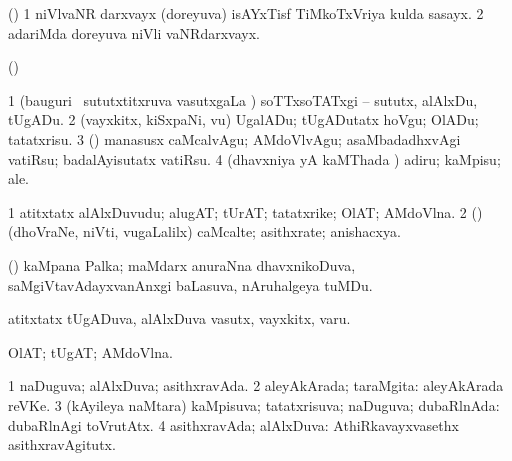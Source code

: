 {{{{{{\bentry
{} 
\gl{\BAavayx}
\expl{}
\bmng
{} 
\emng
\eentry

\bentry
{} 
\gl{\saMkiSx}
\expl{}
\bmng
{} 
\emng
\eentry

\bentry
{} 
\gl{\nA}
\expl{}
\bmng
(\ca) 
\bnum
\num{1} niVlvaNR darxvayx (doreyuva) isAYxTisf TiMkoTxVriya kulda sasayx. 
\num{2} adariMda doreyuva niVli vaNRdarxvayx. 
\enum
\emng
\eentry

\bentry
{} 
\gl{\nA}
\expl{}
\bmng
(\AseTxrXV)  
\emng
\eentry

\bentry
{} 
\gl{\akirx}
\expl{}
\bmng
\bnum
\num{1} (bauguri \mo\ sututxtitxruva vasutxgaLa \vi) soTTxsoTATxgi -- sututx, alAlxDu, tUgADu. 
\num{2} (vayxkitx, kiSxpaNi, \mo vu) UgalADu; tUgADutatx hoVgu; OlADu; tatatxrisu. 
\num{3} (\rUpa) manasusx caMcalvAgu; AMdoVlvAgu; asaMbadadhxvAgi vatiRsu; badalAyisutatx vatiRsu. 
\num{4} (dhavxniya yA kaMThada \vi) adiru; kaMpisu; ale. 
\enum
\emng
\eentry

\bentry
{} 
\gl{\nA}
\expl{}
\bmng
\bnum
\num{1} atitxtatx alAlxDuvudu; alugAT; tUrAT; tatatxrike; OlAT; AMdoVlna. 
\num{2} (\rUpa) (dhoVraNe, niVti, \mo vugaLalilx) caMcalte; asithxrate; anishacxya. 
\enum
\emng
\eentry

\bentry
{} 
\gl{\nA}
\expl{}
\bmng
(\AseTxrXV) kaMpana Palka; maMdarx anuraNna dhavxnikoDuva, saMgiVtavAdayxvanAnxgi baLasuva, nAruhalgeya tuMDu. 
\emng
\eentry

\bentry
{} 
\gl{\nA}
\expl{}
\bmng
atitxtatx tUgADuva, alAlxDuva vasutx, vayxkitx, \mo varu. 
\emng
\eentry

\bentry
{} 
\gl{\nA}
\expl{}
\bmng
OlAT; tUgAT; AMdoVlna. 
\emng
\eentry

\bentry
{} 
\gl{\gu}
\bmng
\bnum
\num{1} naDuguva; alAlxDuva; asithxravAda. 
\num{2} aleyAkArada; taraMgita:  aleyAkArada reVKe. 
\num{3} (kAyileya naMtara) kaMpisuva; tatatxrisuva; naDuguva; dubaRlnAda:  dubaRlnAgi toVrutAtx. 
\num{4} asithxravAda; alAlxDuva:  AthiRkavayxvasethx asithxravAgitutx. 
\enum
\emng

}}}}}}
